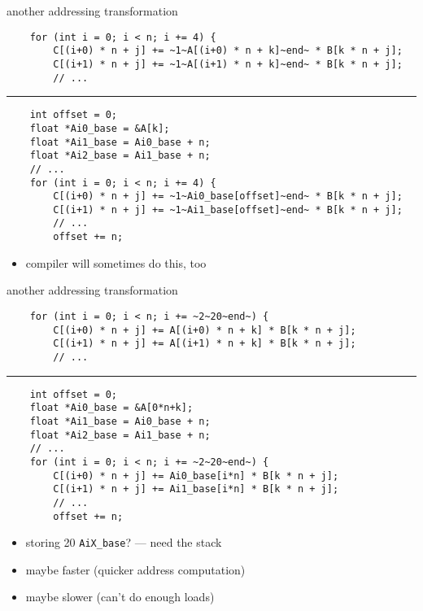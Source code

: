 \begin{frame}[fragile,label=addrXform2]{another addressing transformation}
    \vspace{-.25cm}
\begin{lstlisting}
    for (int i = 0; i < n; i += 4) {
        C[(i+0) * n + j] += ~1~A[(i+0) * n + k]~end~ * B[k * n + j];
        C[(i+1) * n + j] += ~1~A[(i+1) * n + k]~end~ * B[k * n + j];
        // ...
\end{lstlisting}
\hrule
\begin{lstlisting}
    int offset = 0;
    float *Ai0_base = &A[k];
    float *Ai1_base = Ai0_base + n;
    float *Ai2_base = Ai1_base + n;
    // ...
    for (int i = 0; i < n; i += 4) {
        C[(i+0) * n + j] += ~1~Ai0_base[offset]~end~ * B[k * n + j];
        C[(i+1) * n + j] += ~1~Ai1_base[offset]~end~ * B[k * n + j];
        // ...
        offset += n;
\end{lstlisting}
    \begin{itemize}
    \item compiler will sometimes do this, too
    \end{itemize}
\end{frame}

\begin{frame}[fragile,label=addrXform2Backfire]{another addressing transformation}
    \vspace{-.25cm}
\begin{lstlisting}
    for (int i = 0; i < n; i += ~2~20~end~) {
        C[(i+0) * n + j] += A[(i+0) * n + k] * B[k * n + j];
        C[(i+1) * n + j] += A[(i+1) * n + k] * B[k * n + j];
        // ...
\end{lstlisting}
\hrule
\begin{lstlisting}
    int offset = 0;
    float *Ai0_base = &A[0*n+k];
    float *Ai1_base = Ai0_base + n;
    float *Ai2_base = Ai1_base + n;
    // ...
    for (int i = 0; i < n; i += ~2~20~end~) {
        C[(i+0) * n + j] += Ai0_base[i*n] * B[k * n + j];
        C[(i+1) * n + j] += Ai1_base[i*n] * B[k * n + j];
        // ...
        offset += n;
\end{lstlisting}
    \begin{itemize}
    \item storing 20 \lstinline|AiX_base|? --- need the stack
    \item maybe faster (quicker address computation)
    \item maybe slower (can't do enough loads)
    \end{itemize}
\end{frame}

